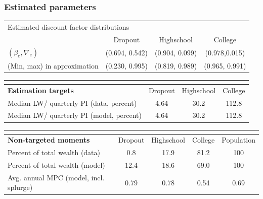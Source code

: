 \documentclass[pdflatex,aspectratio=169]{beamer}
\begin{document}
\begin{frame}
	\frametitle{Estimated parameters}
	\hypertarget{EstimationBetaNabla}{}
	\begin{table}
	\small	
		\begin{tabular}{lccc}
			\multicolumn{4}{l}{Estimated discount factor distributions} \\ 
			& Dropout & Highschool & College \\ \midrule
			$(\beta_e, \nabla_e)$ & (0.694, 0.542) & (0.904, 0.099) & (0.978,0.015) \\
			(Min, max) in approximation & (0.230, 0.995) & (0.819, 0.989) & (0.965, 0.991) \\
			\midrule 
		\end{tabular} 
		\begin{tabular}{lccc}
			\multicolumn{4}{l}{ } \\ \midrule
			\textbf{Estimation targets} & Dropout & Highschool & College \\ \midrule
			Median LW/ quarterly PI (data, percent) & 4.64 & 30.2 & 112.8 \\ 
			Median LW/ quarterly PI (model, percent) & 4.64 & 30.2 & 112.8 %
			\\ \midrule 
		\end{tabular} 
	\footnotesize
		\begin{tabular}{lcccc}
			\multicolumn{5}{l}{ } \\ \midrule
			\textbf{Non-targeted moments} & Dropout & Highschool & College & Population \\ \midrule
			Percent of total wealth (data) & 0.8 & 17.9 & 81.2 & 100 \\
			Percent of total wealth (model) & 12.4 & 18.6 & 69.0 & 100 \\
			Avg. annual MPC (model, incl. splurge) & 0.79 & 0.78 & 0.54 & 0.69
			\\ \bottomrule 
		\end{tabular}
	\end{table}


	\hyperlink{ConsistentWithMicroData}{}
\end{frame}
\end{document}
